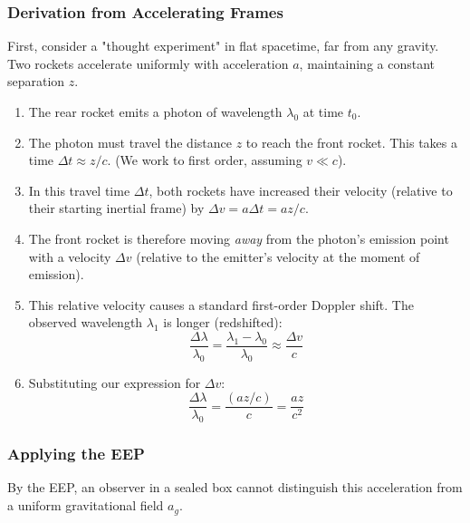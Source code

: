 \documentclass[11pt, a4paper]{report}
\begin{document}
\subsubsection*{Derivation from Accelerating Frames}
First, consider a "thought experiment" in flat spacetime, far from any gravity. Two rockets accelerate uniformly with acceleration $a$, maintaining a constant separation $z$.
\begin{enumerate}
    \item The rear rocket emits a photon of wavelength $\lambda_0$ at time $t_0$.
    \item The photon must travel the distance $z$ to reach the front rocket. This takes a time $\Delta t \approx z/c$. (We work to first order, assuming $v \ll c$).
    \item In this travel time $\Delta t$, both rockets have increased their velocity (relative to their starting inertial frame) by $\Delta v = a \Delta t = az/c$.
    \item The front rocket is therefore moving \emph{away} from the photon's emission point with a velocity $\Delta v$ (relative to the emitter's velocity at the moment of emission).
    \item This relative velocity causes a standard first-order Doppler shift. The observed wavelength $\lambda_1$ is longer (redshifted):
    \begin{equation}
        \frac{\Delta \lambda}{\lambda_0} = \frac{\lambda_1 - \lambda_0}{\lambda_0} \approx \frac{\Delta v}{c}
    \end{equation}
    \item Substituting our expression for $\Delta v$:
    \begin{equation}
        \frac{\Delta \lambda}{\lambda_0} = \frac{(az/c)}{c} = \frac{az}{c^2}
    \end{equation}
\end{enumerate}

\subsubsection*{Applying the EEP}
By the EEP, an observer in a sealed box cannot distinguish this acceleration from a uniform gravitational field $a_g$.




\end{document}
